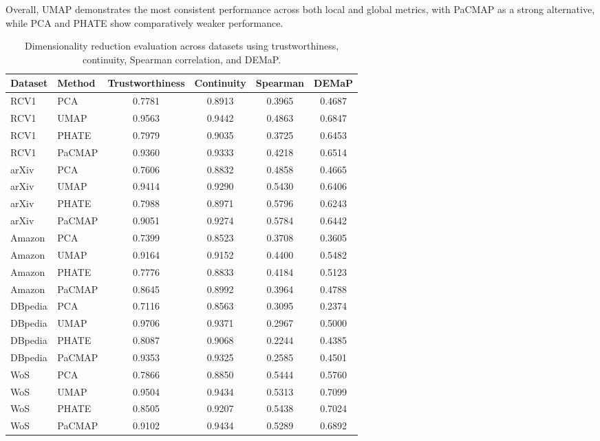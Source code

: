 Overall, UMAP demonstrates the most consistent performance across both local and global metrics, with PaCMAP as a strong alternative, while PCA and PHATE show comparatively weaker performance.
\begin{table}[t]
    \centering
    \caption{Dimensionality reduction evaluation across datasets using trustworthiness, continuity, Spearman correlation, and DEMaP.}
\label{tab:dr_metrics}
    \begin{tabular}{llcccc}
    \toprule
    Dataset & Method & Trustworthiness & Continuity & Spearman & DEMaP \\
    \midrule
    RCV1 & PCA & 0.7781 & 0.8913 & 0.3965 & 0.4687 \\
    RCV1 & UMAP & 0.9563 & 0.9442 & 0.4863 & 0.6847 \\
    RCV1 & PHATE & 0.7979 & 0.9035 & 0.3725 & 0.6453 \\
    RCV1 & PaCMAP & 0.9360 & 0.9333 & 0.4218 & 0.6514 \\
    \midrule
    arXiv & PCA & 0.7606 & 0.8832 & 0.4858 & 0.4665 \\
    arXiv & UMAP & 0.9414 & 0.9290 & 0.5430 & 0.6406 \\
    arXiv & PHATE & 0.7988 & 0.8971 & 0.5796 & 0.6243 \\
    arXiv & PaCMAP & 0.9051 & 0.9274 & 0.5784 & 0.6442 \\
    \midrule
    Amazon & PCA & 0.7399 & 0.8523 & 0.3708 & 0.3605 \\
    Amazon & UMAP & 0.9164 & 0.9152 & 0.4400 & 0.5482 \\
    Amazon & PHATE & 0.7776 & 0.8833 & 0.4184 & 0.5123 \\
    Amazon & PaCMAP & 0.8645 & 0.8992 & 0.3964 & 0.4788 \\
    \midrule
    DBpedia & PCA & 0.7116 & 0.8563 & 0.3095 & 0.2374 \\
    DBpedia & UMAP & 0.9706 & 0.9371 & 0.2967 & 0.5000 \\
    DBpedia & PHATE & 0.8087 & 0.9068 & 0.2244 & 0.4385 \\
    DBpedia & PaCMAP & 0.9353 & 0.9325 & 0.2585 & 0.4501 \\
    \midrule
    WoS & PCA & 0.7866 & 0.8850 & 0.5444 & 0.5760 \\
    WoS & UMAP & 0.9504 & 0.9434 & 0.5313 & 0.7099 \\
    WoS & PHATE & 0.8505 & 0.9207 & 0.5438 & 0.7024 \\
    WoS & PaCMAP & 0.9102 & 0.9434 & 0.5289 & 0.6892 \\
    \bottomrule
    \end{tabular}
\end{table}

